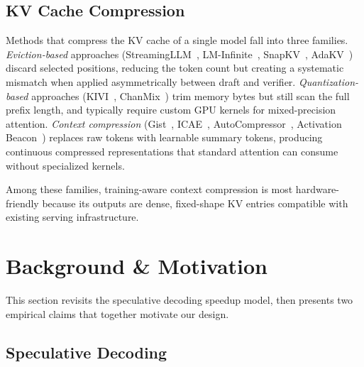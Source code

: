 \subsection{KV Cache Compression}

Methods that compress the KV cache of a single model fall into three families.
\emph{Eviction-based} approaches (StreamingLLM~\citep{xiao2024efficient}, LM-Infinite~\citep{han2024lm}, SnapKV~\citep{li2024snapkv}, AdaKV~\citep{feng2026ada}) discard selected positions, reducing the token count but creating a systematic mismatch when applied asymmetrically between draft and verifier.
\emph{Quantization-based} approaches (KIVI~\citep{liu2023kivi}, ChanMix~\citep{liao2026channel}) trim memory bytes but still scan the full prefix length, and typically require custom GPU kernels for mixed-precision attention.
\emph{Context compression} (Gist~\citep{NEURIPS2023_3d77c6dc}, ICAE~\citep{gecontext}, AutoCompressor~\citep{chevalier2023adapting}, Activation Beacon~\citep{zhanglong}) replaces raw tokens with learnable summary tokens, producing continuous compressed representations that standard attention can consume without specialized kernels.

Among these families, training-aware context compression is most hardware-friendly because its outputs are dense, fixed-shape KV entries compatible with existing serving infrastructure.


\section{Background \& Motivation}
\label{sec:background}

This section revisits the speculative decoding speedup model, then presents two empirical claims that together motivate our design.

\subsection{Speculative Decoding}

